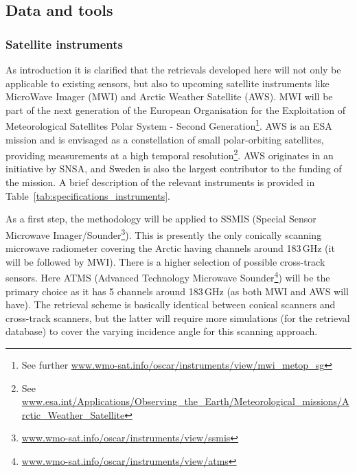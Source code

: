 \documentclass[12pt,oneside,a4paper]{article}
\begin{document}
\subsection{Data and tools}
% 
\subsubsection{Satellite instruments}

As introduction it is clarified that the retrievals developed here will not only be applicable to existing sensors, but also to upcoming satellite
instruments like MicroWave Imager (MWI) and Arctic Weather Satellite (AWS). MWI will be part of the next generation of the European Organisation for the
Exploitation of Meteorological Satellites Polar System - Second
Generation\footnote{See further
  \url{www.wmo-sat.info/oscar/instruments/view/mwi_metop_sg}}. AWS is an ESA mission and is envisaged as a constellation of small polar-orbiting satellites, providing measurements at a high temporal resolution\footnote{See
  \url{www.esa.int/Applications/Observing_the_Earth/Meteorological_missions/Arctic_Weather_Satellite}}.
AWS originates in an initiative by SNSA, and Sweden is also the largest
contributor to the funding of the mission. A brief description of the relevant instruments is provided in Table~\ref{tab:specifications_instruments}.

As a first step, the methodology will be applied to SSMIS (Special Sensor
Microwave Imager/Sounder\footnote{\url{www.wmo-sat.info/oscar/instruments/view/ssmis}}). This is presently the only conically scanning
microwave radiometer covering the Arctic having channels around 183\,GHz (it
will be followed by MWI). There is a higher selection of possible cross-track sensors. Here ATMS (Advanced Technology Microwave Sounder\footnote{\url{www.wmo-sat.info/oscar/instruments/view/atms}}) will be the primary choice as it has 5 channels around 183\,GHz (as both MWI and AWS will have). The retrieval scheme is basically identical between conical scanners and cross-track scanners, but the latter will require more simulations (for the retrieval database) to cover the varying incidence angle for this scanning approach.
\end{document}
